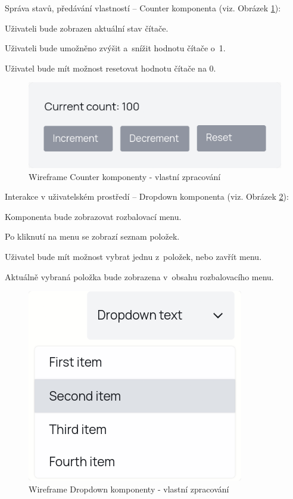 \begin{citemize}
	\item Správa stavů, předávání vlastností -- Counter komponenta (viz. Obrázek \ref{fig:counterwireframe}):
	
	\begin{cenumerate}
		\item Uživateli bude zobrazen aktuální stav čítače.
		\item Uživateli bude umožněno zvýšit a~snížit hodnotu čítače o~1.
		\item Uživatel bude mít možnost resetovat hodnotu čítače na 0.
	\end{cenumerate}

	\begin{figure}[htb]
		\centering
			\includegraphics[width=.5\textwidth]{images/Counter-wireframe.png}
		\caption[Wireframe Counter komponenty]{Wireframe Counter komponenty - vlastní zpracování}
		\label{fig:counterwireframe}
	\end{figure}

	\item Interakce v uživatelském prostředí -- Dropdown komponenta (viz. Obrázek \ref{fig:dropdownwireframe}):
	
	\begin{cenumerate}
		\item Komponenta bude zobrazovat rozbalovací menu.
		\item Po kliknutí na menu se zobrazí seznam položek.
		\item Uživatel bude mít možnost vybrat jednu z~položek, nebo zavřít menu.
		\item Aktuálně vybraná položka bude zobrazena v~obsahu rozbalovacího menu.
	\end{cenumerate}

	\begin{figure}[htb]
		\centering
			\includegraphics[width=.4\textwidth]{images/Dropdown-wireframe.png}
		\caption[Wireframe Dropdown komponenty]{Wireframe Dropdown komponenty - vlastní zpracování}
		\label{fig:dropdownwireframe}
	\end{figure}


\end{citemize}
